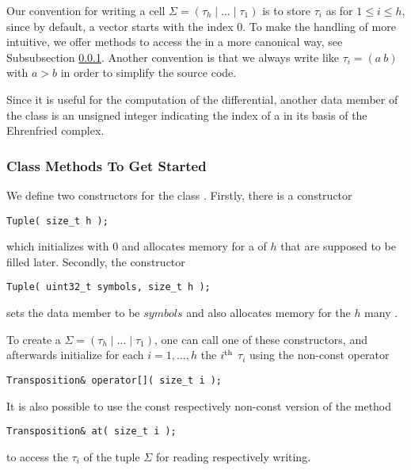Our convention for writing a cell $\Sigma = (\tau_h \mid \ldots \mid \tau_1)$ is 
to store $\tau_i$ as  for $1 \leq i \leq h$, since by default, a vector starts with the index $0$. 
To make the handling of  more intuitive, 
we offer methods to access the  in a more canonical way, see Subsubsection \ref{program:kappa:tuple:get_started}. 
Another convention is that we always write  like $\tau_i = (a\ b)$ with $a > b$ in order to simplify the source code.

Since it is useful for the computation of the differential, 
another data member of the class  is an unsigned integer  indicating the index of a  in its basis of the Ehrenfried complex.

\subsubsection{Class Methods To Get Started}
\label{program:kappa:tuple:get_started}

We define two constructors for the class . 
Firstly, there is a constructor
\begin{lstlisting}
Tuple( size_t h );
\end{lstlisting}
which initializes  with $0$ and allocates memory for a  of $h$  
that are supposed to be filled later. 
Secondly, the constructor
\begin{lstlisting}
Tuple( uint32_t symbols, size_t h );
\end{lstlisting}
sets the data member  to be $symbols$ and also allocates memory for the $h$ many . 

To create a  $\Sigma = (\tau_h \mid \ldots \mid \tau_1)$, one can call one of these constructors, 
and afterwards initialize for each $i = 1, \dotsc, h$ the $i^{\text{th}}$  $\tau_i$ using the non-const operator 
\begin{lstlisting}
Transposition& operator[]( size_t i );
\end{lstlisting}
It is also possible to use the const respectively non-const version of the method
\begin{lstlisting}
Transposition& at( size_t i );
\end{lstlisting}
to access the  $\tau_i$ of the tuple $\Sigma$ for reading respectively writing. 

